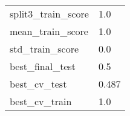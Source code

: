 \begin{tabular}{ll}
split3\_train\_score      &                                                1.0 \\
mean\_train\_score        &                                                1.0 \\
std\_train\_score         &                                                0.0 \\
best\_final\_test         &                                                0.5 \\
best\_cv\_test            &                                              0.487 \\
best\_cv\_train           &                                                1.0 \\
\bottomrule
\end{tabular}
